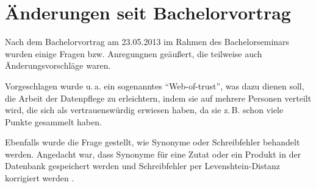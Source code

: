 \documentclass[a4paper,11pt,bibtotoc,headsepline]{scrartcl}
\begin{document}
\section{Änderungen seit Bachelorvortrag} %

Nach dem Bachelorvortrag am 23.05.2013 im Rahmen des Bachelorseminars
wurden einige Fragen bzw. Anregungnen geäußert, die teilweise auch
Änderungsvorschläge waren.

Vorgeschlagen wurde u.\,a. ein sogenanntes ``Web-of-trust'', was dazu
dienen soll, die Arbeit der Datenpflege zu erleichtern, indem sie auf
mehrere Personen verteilt wird, die sich als vertrauenswürdig erwiesen
haben, da sie z.\,B. schon viele Punkte gesammelt haben.

Ebenfalls wurde die Frage gestellt, wie Synonyme oder Schreibfehler
behandelt werden. Angedacht war, dass Synonyme für eine Zutat oder ein
Produkt in der Datenbank gespeichert werden und Schreibfehler per
Levenshtein-Distanz korrigiert werden \cite{dam64}.



\renewcommand\refname{7 Literatur}

\end{document}
